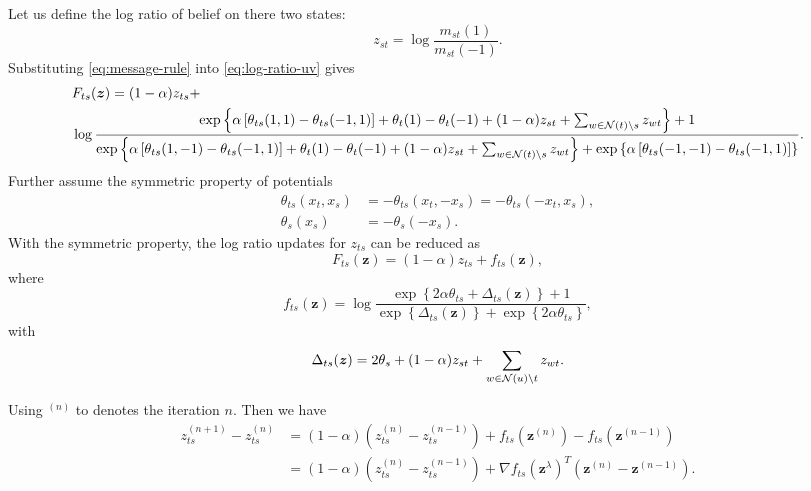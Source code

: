 \documentclass[conference,onecolumn]{IEEEtran}
\begin{document}
Let us define the log ratio of belief on there two states:
\begin{equation}\label{eq:log-ratio-uv}
  z_{st} = \log\frac{m_{st}(1)}{m_{st}(-1)}.
\end{equation}
Substituting \eqref{eq:message-rule} into \eqref{eq:log-ratio-uv} gives
\begin{align}
  &F_{ts}(\bm{z}) = (1- \alpha)z_{ts} + \\
  &\log\frac{\exp\left\{ \alpha\left[ \theta_{ts}(1,1) - \theta_{ts}(-1,1) \right] + \theta_t(1) - \theta_t(-1) + (1 - \alpha)z_{st} + \sum_{w\in \mathcal{N}(t)\backslash s} z_{wt} \right\}+1}
    {\exp\left\{ \alpha\left[ \theta_{ts}(1,-1) - \theta_{ts}(-1,1) \right] + \theta_t(1) - \theta_t(-1) + (1 - \alpha)z_{st} + \sum_{w\in \mathcal{N}(t)\backslash s} z_{wt} \right\} +
    \exp\left\{ \alpha\left[ \theta_{ts}(-1,-1) - \theta_{ts}(-1,1) \right] \right\}}.
\end{align}
Further assume the symmetric property of potentials
\begin{align}
  \theta_{ts}(x_t, x_s) &= -\theta_{ts}(x_t, -x_s) = -\theta_{ts}(-x_t, x_s), \\
  \theta_{s}(x_s) &= - \theta_s(-x_s).
\end{align}
With the symmetric property, the log ratio updates for $z_{ts}$ can be reduced as
\begin{equation}\label{eq:ratio-update}
  F_{ts}(\bm{z}) = (1-\alpha) z_{ts} + f_{ts}(\bm{z}),
\end{equation}
where
\begin{equation}
  f_{ts}(\bm{z}) = \log\frac{\exp\left\{ 2 \alpha \theta_{ts} + \Delta_{ts}(\bm{z}) \right\}+1}
  {\exp\left\{ \Delta_{ts}(\bm{z}) \right\} +
    \exp\left\{ 2 \alpha \theta_{ts} \right\}},
\end{equation}
with
\begin{equation}
  \Delta_{ts}(\bm{z}) = 2 \theta_s + (1 - \alpha) z_{st} + \sum_{w\in \mathcal{N}(u)\backslash t} z_{wt}.
\end{equation}

Using $^{(n)}$ to denotes the iteration $n$. Then we have
\begin{align}\label{eq:ratio_diff_at_n}
  z_{ts}^{(n+1)} - z_{ts}^{(n)} &= (1-\alpha) (z_{ts}^{(n)} - z_{ts}^{(n-1)}) + f_{ts}(\bm{z}^{(n)}) - f_{ts}(\bm{z}^{(n-1)}) \nonumber \\
                                & = (1-\alpha) (z_{ts}^{(n)} - z_{ts}^{(n-1)}) + \nabla f_{ts}(\bm{z}^{\lambda})^{T} (\bm{z}^{(n)} - \bm{z}^{(n-1)}).
\end{align}
\end{document}
